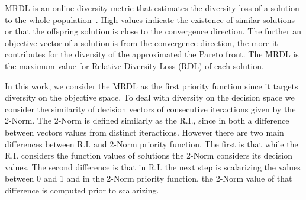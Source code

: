 %


MRDL is an online diversity metric that estimates the diversity loss of a solution to the whole population~\cite{gee2015online}. High values indicate the existence of similar solutions or that the offspring solution is close to the convergence direction. The further an objective vector of a solution is from the convergence direction, the more it contributes for the diversity of the approximated the Pareto front. The MRDL is the maximum value for Relative Diversity Loss (RDL) of each solution.


In this work, we consider the MRDL as the first priority function since it targets diversity on the objective space. To deal with diversity on the decision space we consider the similarity of decision vectors of consecutive iteractions given by the 2-Norm. The 2-Norm is defined similarly as the R.I., since in both a difference between vectors values from distinct iteractions. However there are two main differences between R.I. and 2-Norm priority function. The first is that while the R.I. considers the function values of solutions the 2-Norm considers its decision values. The second difference is that in R.I. the next step is scalarizing the values between 0 and 1 and in the 2-Norm priority function, the 2-Norm value of that difference is computed prior to scalarizing. 







